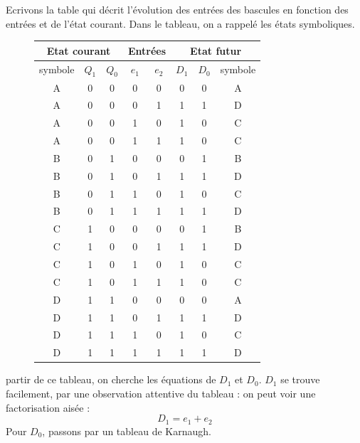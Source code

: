 \documentclass[a4paper,11pt]{article}
\begin{document}
Ecrivons la table qui décrit l'évolution des entrées des bascules en fonction des entrées et de l'état courant. Dans le tableau, on a rappelé les états symboliques.

\begin{figure}
\begin{center}
      \begin{tabular}{|c|c|c|c|c||c|c|c|}
          \hline
          \multicolumn{3}{|c|}{Etat courant} & \multicolumn{2}{c||}{Entrées} & \multicolumn{3}{c|}{Etat futur} \\ \hline
          symbole  & $Q_1$ & $Q_0$ & $e_1$ & $e_2$ & $D_1$ & $D_0$ & symbole  \\ \hline \hline
          A & 0 & 0 & 0 & 0 & 0 & 0  & A \\ \hline
          A & 0 & 0 & 0 & 1 & 1 & 1 & D  \\ \hline
          A & 0 & 0 & 1 & 0 & 1 & 0 & C\\ \hline
          A & 0 & 0 & 1 & 1 & 1 & 0 & C\\ \hline \hline
          B & 0 & 1 & 0 & 0 & 0 & 1  & B\\ \hline
          B & 0 & 1 & 0 & 1 & 1 & 1  & D\\ \hline
          B & 0 & 1 & 1 & 0 & 1 & 0  & C\\ \hline
          B & 0 & 1 & 1 & 1 & 1 & 1  & D\\ \hline \hline
          C & 1 & 0 & 0 & 0 & 0 & 1  & B\\ \hline
          C & 1 & 0 & 0 & 1 & 1 & 1  & D\\ \hline
          C & 1 & 0 & 1 & 0 & 1 & 0  & C\\ \hline
          C & 1 & 0 & 1 & 1 & 1 & 0  & C\\ \hline \hline
          D & 1 & 1 & 0 & 0 & 0 & 0  & A\\ \hline
          D & 1 & 1 & 0 & 1 & 1 & 1  & D\\ \hline
          D & 1 & 1 & 1 & 0 & 1 & 0  & C\\ \hline
          D & 1 & 1 & 1 & 1 & 1 & 1  & D\\ \hline
      \end{tabular}
\end{center}
\end{figure}
partir de ce tableau, on cherche les équations de $D_1$ et $D_0$. $D_1$ se trouve facilement, par une observation attentive du tableau : on peut voir une factorisation aisée :
$$D_1=e_1+e_2$$
Pour $D_0$, passons par un tableau de Karnaugh.
\end{document}
